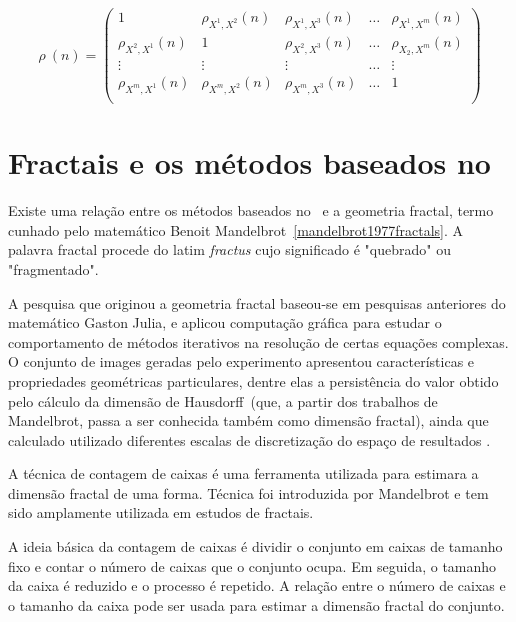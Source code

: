 \begin{equation}
  \rho~(n) = \left(\begin{matrix}
    1                     & \rho_{X^{1},X^{2}}(n) & \rho_{X^{1},X^{3}}(n) & \dots & \rho_{X^{1},X^{m}}(n) \\
    \rho_{X^{2},X^{1}}(n) & 1                     & \rho_{X^{2},X^{3}}(n) & \dots & \rho_{X_{2},X^{m}}(n) \\
    \vdots                & \vdots                & \vdots                & \dots & \vdots                \\
    \rho_{X^{m},X^{1}}(n) & \rho_{X^{m},X^{2}}(n) & \rho_{X^{m},X^{3}}(n) & \dots & 1                     \\
  \end{matrix}\right)
  \label{eq:p_dcca_matrix}
\end{equation}

\section{Fractais e os métodos baseados no \dfa}
\label{ss:dfa_fract}

Existe uma relação entre os métodos baseados no \dfa~e a geometria fractal, termo cunhado pelo matemático Benoit Mandelbrot~\ref{mandelbrot1977fractals}. A palavra fractal procede do latim \textit{fractus} cujo significado é "quebrado" ou "fragmentado".

A pesquisa que originou a geometria fractal baseou-se em pesquisas anteriores do matemático Gaston Julia, e aplicou computação gráfica para estudar o comportamento de métodos iterativos na resolução de certas equações complexas. O conjunto de images geradas pelo experimento apresentou características e propriedades geométricas particulares, dentre elas a persistência do valor obtido pelo cálculo da dimensão de Hausdorff~(que, a partir dos trabalhos de Mandelbrot, passa a ser conhecida também como dimensão fractal), ainda que calculado utilizado diferentes escalas de discretização do espaço de resultados \cite{mandelbrot1983fractal}.

A técnica de contagem de caixas é uma ferramenta utilizada para estimara a dimensão fractal de uma forma. Técnica foi introduzida por Mandelbrot e tem sido amplamente utilizada em estudos de fractais.

A ideia básica da contagem de caixas é dividir o conjunto em caixas de tamanho fixo e contar o número de caixas que o conjunto ocupa. Em seguida, o tamanho da caixa é reduzido e o processo é repetido. A relação entre o número de caixas e o tamanho da caixa pode ser usada para estimar a dimensão fractal do conjunto.

